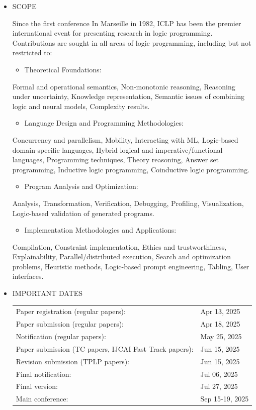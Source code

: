 \documentclass[prodmode,acmtecs]{acmsmall} %
\begin{document}
\begin{itemize}\item  SCOPE 
 
  Since the first conference In Marseille in 1982, ICLP has been the premier international event for presenting research in logic programming. Contributions are sought in all areas of logic programming, including but not restricted to: 
 
\begin{itemize}\item  Theoretical Foundations:
\end{itemize} 
  Formal and operational semantics, Non-monotonic reasoning, Reasoning under uncertainty, Knowledge representation, Semantic issues of combining logic and neural models, Complexity results. 
 
\begin{itemize}\item  Language Design and Programming Methodologies:
\end{itemize} 
  Concurrency and parallelism, Mobility, Interacting with ML, Logic-based domain-specific languages, Hybrid logical and imperative/functional languages, Programming techniques, Theory reasoning, Answer set programming, Inductive logic programming, Coinductive logic programming. 
 
\begin{itemize}\item  Program Analysis and Optimization:
\end{itemize} 
  Analysis, Transformation, Verification, Debugging, Profiling, Visualization, Logic-based validation of generated programs. 
 
\begin{itemize}\item  Implementation Methodologies and Applications:
\end{itemize} 
  Compilation, Constraint implementation, Ethics and trustworthiness, Explainability, Parallel/distributed execution, Search and optimization problems, Heuristic methods, Logic-based prompt engineering, Tabling, User interfaces. 
 
\item  IMPORTANT DATES 
 
\begin{tabulary}{\linewidth}{LL}Paper registration (regular papers):  & Apr 13, 2025 \\
Paper submission (regular papers):  & Apr 18, 2025 \\
Notification (regular papers):  & May 25, 2025 \\
Paper submission (TC papers, IJCAI Fast Track papers):  & Jun 15, 2025 \\
Revision submission (TPLP papers):  & Jun 15, 2025 \\
Final notification:  & Jul 06, 2025 \\
Final version:  & Jul 27, 2025 \\
Main conference:  & Sep 15-19, 2025 \\
\end{tabulary}
 

\end{itemize}
\end{document}
